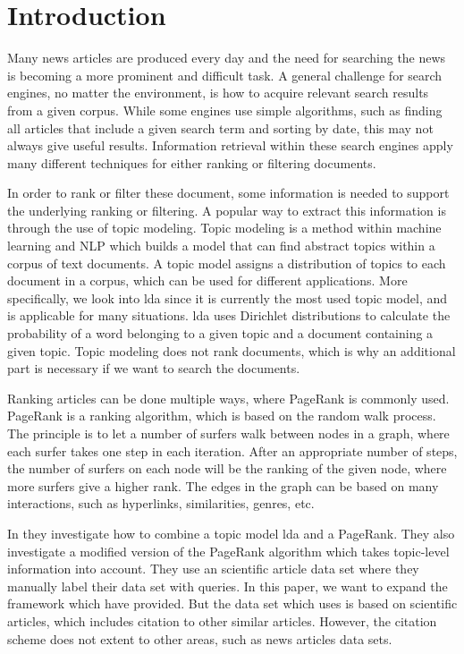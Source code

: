 \section{Introduction} 


Many news articles are produced every day and the need for searching the news is becoming a more prominent and difficult task.
A general challenge for search engines, no matter the environment, is how to acquire relevant search results from a given corpus. 
While some engines use simple algorithms, such as finding all articles that include a given search term and sorting by date, this may not always give useful results.
Information retrieval within these search engines apply many different techniques for either ranking or filtering documents\cite{google_pagerank2006}.

In order to rank or filter these document, some information is needed to support the underlying ranking or filtering.
A popular way to extract this information is through the use of topic modeling.
Topic modeling is a method within machine learning and \gls{NLP} which builds a model that can find abstract topics within a corpus of text documents.
A topic model assigns a distribution of topics to each document in a corpus, which can be used for different applications.
More specifically, we look into \gls{lda} since it is currently the most used topic model, and is applicable for many situations\cite{lda}.
\gls{lda} uses Dirichlet distributions to calculate the probability of a word belonging to a given topic and a document containing a given topic.
Topic modeling does not rank documents, which is why an additional part is necessary if we want to search the documents.

Ranking articles can be done multiple ways, where PageRank is commonly used\cite{google_pagerank2006}.
PageRank\cite{pagerank_1999} is a ranking algorithm, which is based on the random walk process.
The principle is to let a number of surfers walk between nodes in a graph, where each surfer takes one step in each iteration.
After an appropriate number of steps, the number of surfers on each node will be the ranking of the given node, where more surfers give a higher rank.
The edges in the graph can be based on many interactions, such as hyperlinks, similarities, genres, etc.

In \cite{yang2009topic} they investigate how to combine a topic model \gls{lda} and a PageRank.
They also investigate a modified version of the PageRank algorithm which takes topic-level information into account.
They use an scientific article data set where they manually label their data set with queries. 
In this paper, we want to expand the framework which \cite{yang2009topic} have provided.
But the data set which \cite{yang2009topic} uses is based on scientific articles, which includes citation to other similar articles.
However, the citation scheme does not extent to other areas, such as news articles data sets.

